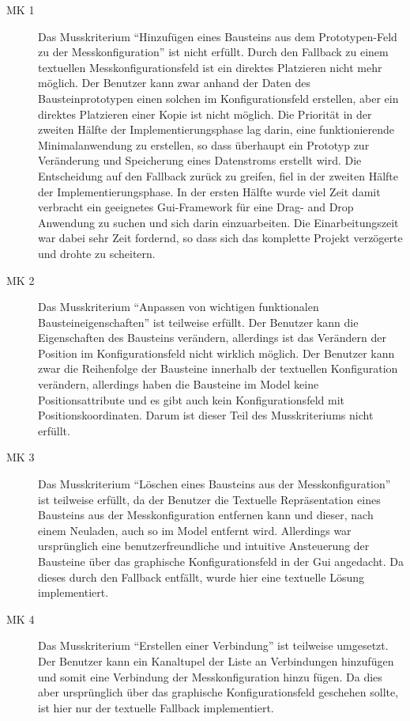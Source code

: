 \documentclass[parskip=full]{scrartcl}
\begin{document}
\begin{description}
\item[MK 1] Das Musskriterium "`Hinzufügen eines Bausteins aus dem Prototypen-Feld zu der Messkonfiguration"' ist nicht erfüllt. Durch den Fallback zu einem textuellen Messkonfigurationsfeld ist ein direktes Platzieren nicht mehr möglich. Der Benutzer kann zwar anhand der Daten des Bausteinprototypen einen solchen im Konfigurationsfeld erstellen, aber ein direktes Platzieren einer Kopie ist nicht möglich. Die Priorität in der zweiten Hälfte der Implementierungsphase lag darin, eine funktionierende Minimalanwendung zu erstellen, so dass überhaupt ein Prototyp zur Veränderung und Speicherung eines Datenstroms erstellt wird. Die Entscheidung auf den Fallback zurück zu greifen, fiel in der zweiten Hälfte der Implementierungsphase. In der ersten Hälfte wurde viel Zeit damit verbracht ein geeignetes Gui-Framework für eine Drag- and Drop Anwendung zu suchen und sich darin einzuarbeiten. Die Einarbeitungszeit war dabei sehr Zeit fordernd, so dass sich das komplette Projekt verzögerte und drohte zu scheitern.
\item[MK 2] Das Musskriterium "`Anpassen von wichtigen funktionalen Bausteineigenschaften"' ist teilweise erfüllt. Der Benutzer kann die Eigenschaften des Bausteins verändern, allerdings ist das Verändern der Position im Konfigurationsfeld nicht wirklich möglich. Der Benutzer kann zwar die Reihenfolge der Bausteine innerhalb der textuellen Konfiguration verändern, allerdings haben die Bausteine im Model keine Positionsattribute und es gibt auch kein Konfigurationsfeld mit Positionskoordinaten. Darum ist dieser Teil des Musskriteriums nicht erfüllt. 
\item[MK 3] Das Musskriterium "`Löschen eines Bausteins aus der Messkonfiguration"' ist teilweise erfüllt, da der Benutzer die Textuelle Repräsentation eines Bausteins aus der Messkonfiguration entfernen kann und dieser, nach einem Neuladen, auch so im Model entfernt wird. Allerdings war ursprünglich eine benutzerfreundliche und intuitive Ansteuerung der Bausteine über das graphische Konfigurationsfeld in der Gui angedacht. Da dieses durch den Fallback entfällt, wurde hier eine textuelle Lösung implementiert.
\item[MK 4] Das Musskriterium "`Erstellen einer Verbindung"' ist teilweise umgesetzt. Der Benutzer kann ein Kanaltupel der Liste an Verbindungen hinzufügen und somit eine Verbindung der Messkonfiguration hinzu fügen. Da dies aber ursprünglich über das graphische Konfigurationsfeld geschehen sollte, ist hier nur der textuelle Fallback implementiert. 

\end{description}
\end{document}

